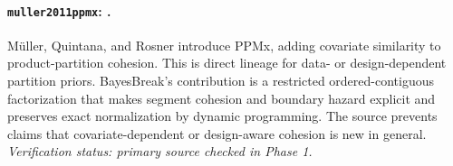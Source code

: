 
\paragraph{\texttt{muller2011ppmx}: \citet{muller2011ppmx}.}
M\"uller, Quintana, and Rosner introduce PPMx, adding covariate similarity to product-partition cohesion. This is direct lineage for data- or design-dependent partition priors. BayesBreak's contribution is a restricted ordered-contiguous factorization that makes segment cohesion and boundary hazard explicit and preserves exact normalization by dynamic programming. The source prevents claims that covariate-dependent or design-aware cohesion is new in general. \textit{Verification status: primary source checked in Phase 1.}
